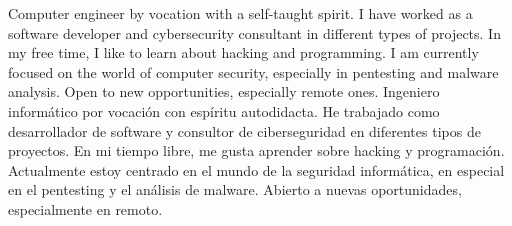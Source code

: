 	{}
	{}


\begin{cvparagraph}

	{
		Computer engineer by vocation with a self-taught spirit. I have worked as a software developer and cybersecurity consultant in different types of projects. In my free time, I like to learn about hacking and programming. I am currently focused on the world of computer security, especially in pentesting and malware analysis. Open to new opportunities, especially remote ones.
	}
	{
		Ingeniero informático por vocación con espíritu autodidacta. He trabajado como desarrollador de software y consultor de ciberseguridad en diferentes tipos de proyectos. En mi tiempo libre, me gusta aprender sobre hacking y programación. Actualmente estoy centrado en el mundo de la seguridad informática, en especial en el pentesting y el análisis de malware. Abierto a nuevas oportunidades, especialmente en remoto.
	}

\end{cvparagraph}